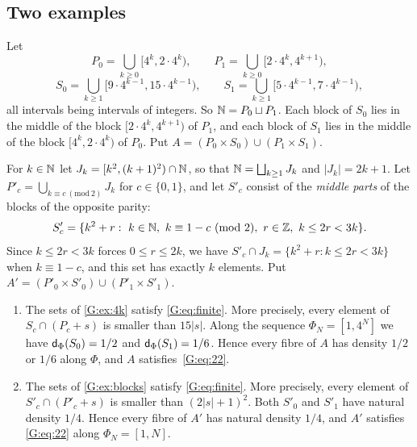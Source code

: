 \subsection{Two examples}

\begin{example}[Scale $4^k$]\label{G:ex:4k}
Let
\[
P_0=\bigcup_{k\ge0}[4^k,2\cdot4^k),\qquad P_1=\bigcup_{k\ge0}[2\cdot4^k,4^{k+1}),
\]
\[
S_0=\bigcup_{k\ge1}[9\cdot4^{k-1},15\cdot4^{k-1}),\qquad
S_1=\bigcup_{k\ge1}[5\cdot4^{k-1},7\cdot4^{k-1}),
\]
all intervals being intervals of integers. So $\mathbb{N}=P_0\sqcup P_1$. Each block of $S_0$
lies in the middle of the block $[2\cdot4^k,4^{k+1})$ of $P_1$, and each block of $S_1$
lies in the middle of the block $[4^k,2\cdot4^k)$ of $P_0$. Put
$A=(P_0\times S_0)\cup(P_1\times S_1)$.
\end{example}

\begin{example}\label{G:ex:blocks}
For $k\in\mathbb{N}$ let $J_k=[k^2,(k+1)^2)\cap\mathbb{N}$, so that $\mathbb{N}=\bigsqcup_{k\ge1}J_k$ and
$|J_k|=2k+1$. Let $P'_c=\bigcup_{k\equiv c\ (\mathrm{mod}\ 2)}J_k$ for $c\in\{0,1\}$, and let
$S'_c$ consist of the \emph{middle parts} of the blocks of the opposite parity:
\[
S'_c=\{k^2+r:\ k\in\N,\ k\equiv1-c\ (\mathrm{mod}\ 2),\ r\in\Z,\ k\le2r<3k\}.
\]
Since $k\le 2r<3k$ forces $0\le r\le 2k$, we have $S'_c\cap J_k=\{k^2+r:k\le2r<3k\}$ when
$k\equiv1-c$, and this set has exactly $k$ elements. Put
$A'=(P'_0\times S'_0)\cup(P'_1\times S'_1)$.
\end{example}

\begin{proposition}\label{G:prop:examples}
\begin{enumerate}[label=\textup{(\roman*)}]
\item The sets of \cref{G:ex:4k} satisfy \eqref{G:eq:finite}. More precisely, every element
of $S_c\cap(P_c+s)$ is smaller than $15|s|$. Along the \Fol{} sequence
$\Phi_N=[1,4^N]$ we have $\mathsf{d}_\Phi(S_0)=1/2$ and $\mathsf{d}_\Phi(S_1)=1/6$. Hence every fibre
of $A$ has density $1/2$ or $1/6$ along $\Phi$, and $A$ satisfies~\eqref{G:eq:22}.
\item The sets of \cref{G:ex:blocks} satisfy \eqref{G:eq:finite}. More precisely, every
element of $S'_c\cap(P'_c+s)$ is smaller than $(2|s|+1)^2$. Both $S'_0$ and $S'_1$ have
natural density $1/4$. Hence every fibre of $A'$ has natural density $1/4$, and $A'$
satisfies \eqref{G:eq:22} along $\Phi_N=[1,N]$.
\end{enumerate}
\end{proposition}

